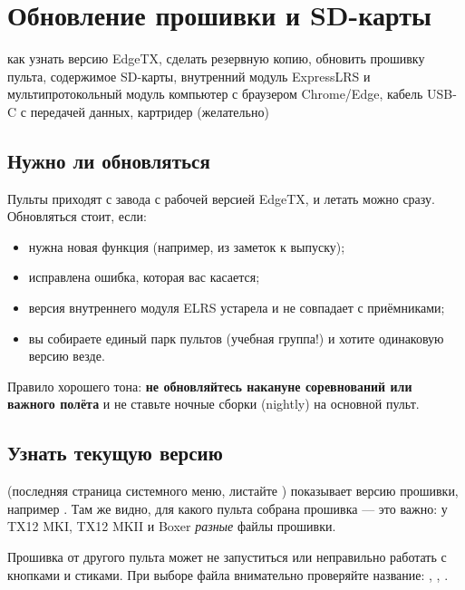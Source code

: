 \chapter{Обновление прошивки и SD-карты}
\label{ch:firmware}
\chapterintro
  {как узнать версию EdgeTX, сделать резервную копию, обновить прошивку пульта, содержимое
   SD-карты, внутренний модуль ExpressLRS и мультипротокольный модуль}
  {компьютер с браузером Chrome/Edge, кабель USB-C с передачей данных, картридер (желательно)}

\section{Нужно ли обновляться}

Пульты приходят с завода с рабочей версией EdgeTX, и летать можно сразу. Обновляться стоит,
если:
\begin{itemize}
  \item нужна новая функция (например, из заметок к выпуску);
  \item исправлена ошибка, которая вас касается;
  \item версия внутреннего модуля ELRS устарела и не совпадает с приёмниками;
  \item вы собираете единый парк пультов (учебная группа!) и хотите одинаковую версию везде.
\end{itemize}

Правило хорошего тона: \textbf{не обновляйтесь накануне соревнований или важного полёта} и
не ставьте ночные сборки (nightly) на основной пульт.

\section{Узнать текущую версию}

 (последняя страница системного меню, листайте ) показывает
версию прошивки, например . Там же видно, для какого пульта
собрана прошивка --- это важно: у TX12 MKI, TX12 MKII и Boxer \emph{разные} файлы прошивки.

\begin{caution}
Прошивка от другого пульта может не запуститься или неправильно работать с кнопками и
стиками. При выборе файла внимательно проверяйте название: , ,
.
\end{caution}


